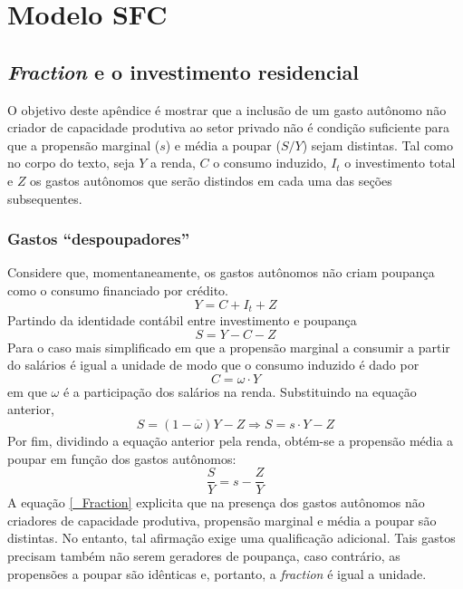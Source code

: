 \titleformat{\chapter}[display]{\normalfont\huge}{\appendixname{} \thechapter}{20pt}{\bfseries\huge}
\chapter{Modelo SFC}
\label{Append_Fraction}


\section{\textit{Fraction} e o investimento residencial}

O objetivo deste apêndice é mostrar que a inclusão de um gasto autônomo não criador de capacidade produtiva ao setor privado não é condição suficiente para que a propensão marginal ($s$) e média a poupar ($S/Y$) sejam distintas. Tal como no corpo do texto, seja $Y$ a renda, $C$ o consumo induzido, $I_t$ o investimento total e $Z$ os gastos autônomos que serão distindos em cada uma das seções subsequentes.

\subsection{Gastos ``despoupadores''}

Considere que, momentaneamente, os gastos autônomos não criam poupança como o consumo financiado por crédito. 
$$
Y = C + I_t + Z
$$
Partindo da identidade contábil entre investimento e poupança
$$
S = Y - C - Z
$$
Para o caso mais simplificado em que a propensão marginal a consumir a partir do salários é igual a unidade de modo que o consumo induzido é dado por
$$
C = \omega\cdot Y
$$
em que $\omega$ é a participação dos salários na renda. Substituindo na equação anterior,
$$
S = (1-\overline \omega)Y - Z \Rightarrow S = s\cdot Y - Z
$$
Por fim, dividindo a equação anterior pela renda, obtém-se a propensão média a poupar em função dos gastos autônomos:
\begin{equation}
\label{_Fraction}
    \frac{S}{Y} = s - \frac{Z}{Y}
\end{equation}
A equação \ref{_Fraction} explicita que na presença dos gastos autônomos não criadores de capacidade produtiva, propensão marginal e média a poupar são distintas. No entanto, tal afirmação exige uma qualificação adicional. Tais gastos precisam também não serem geradores de poupança, caso contrário, as propensões a poupar são idênticas e, portanto, a \textit{fraction} é igual a unidade.

